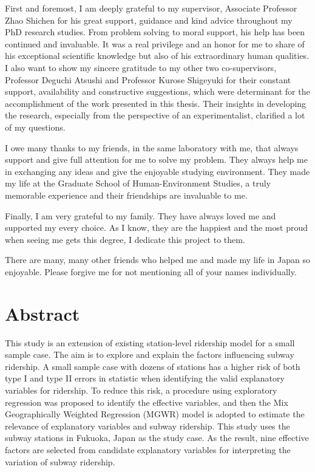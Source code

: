 \documentclass[12pt, twoside, a4paper]{book} %
\begin{document}
%
First and foremost, I am deeply grateful to my supervisor, Associate Professor Zhao Shichen for his great support, guidance and kind advice throughout my PhD research studies. From problem solving to moral support, his help has been continued and invaluable. It was a real privilege and an honor for me to share of his exceptional scientific knowledge but also of his extraordinary human qualities.
I also want to show my sincere gratitude to my other two co-supervisors, Professor Deguchi Atsushi and Professor Kurose Shigeyuki for their constant support, availability and constructive suggestions, which were determinant for the accomplishment of the work presented in this thesis. Their insights in developing the research, especially from the perspective of an experimentalist, clarified a lot of my questions.

%
I owe many thanks to my friends, in the same laboratory with me, that always support and give full attention for me to solve my problem. They always help me in exchanging any ideas and give the enjoyable studying environment. They made my life at the Graduate School of Human-Environment Studies, a truly memorable experience and their friendships are invaluable to me.

%
Finally, I am very grateful to my family. They have always loved me and supported my every choice. As I know, they are the happiest and the most proud when seeing me gets this degree, I dedicate this project to them. 

%
There are many, many other friends who helped me and made my life in Japan so enjoyable. Please forgive me for not mentioning all of your names individually.

\chapter{Abstract}

This study is an extension of existing station-level ridership model for a small sample case. The aim is to explore and explain the factors influencing subway ridership. A small sample case with dozens of stations has a higher risk of both type I and type II errors in statistic when identifying the valid explanatory variables for ridership. To reduce this risk, a procedure using exploratory regression was proposed to identify the effective variables, and then the Mix Geographically Weighted Regression (MGWR) model is adopted to estimate the relevance of explanatory variables and subway ridership. This study uses the subway stations in Fukuoka, Japan as the study case. As the result, nine effective factors are selected from candidate explanatory variables for interpreting the variation of subway ridership.
\end{document}
